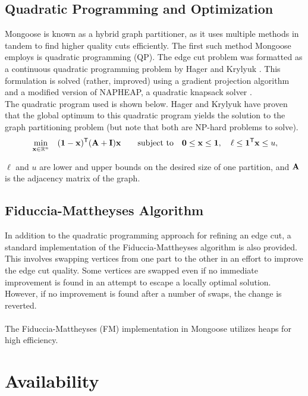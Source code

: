 \documentclass[letter]{article}
\newcommand{\m}[1]{{\bf{#1}}}
\newcommand{\tr}{^{\sf T}}
\begin{document}
\subsection{Quadratic Programming and Optimization}

Mongoose is known as a hybrid graph partitioner, as it uses multiple methods in tandem to find higher quality cuts efficiently. The first such method Mongoose employs is quadratic programming (QP). The edge cut problem was formatted as a continuous quadratic programming problem by Hager and Krylyuk \cite{HagerKrylyuk1999}. This formulation is solved (rather, improved) using a gradient projection algorithm and a modified version of NAPHEAP, a quadratic knapsack solver \cite{DavisHagerHungerford2016}.
\\

The quadratic program used is shown below. Hager and Krylyuk have proven that the global optimum to this quadratic program yields the solution to the graph partitioning problem (but note that both are NP-hard problems to solve).
%
\begin{eqnarray}
&\displaystyle\min_{\m{x}\in\mathbb{R}^n}\quad  (\m{1} - \m{x})\tr (\m{A} + \m{I})\m{x}
& \quad \mbox{subject to}  \quad
\m{0} \le \m{x} \le \m{1}, \quad \ell \le \m{1}\tr \m{x} \le u, \nonumber
\end{eqnarray}

$\ell$ and $u$ are lower and upper bounds on the desired size of one partition, and $\m{A}$ is the adjacency matrix of the graph.

\subsection{Fiduccia-Mattheyses Algorithm}

In addition to the quadratic programming approach for refining an edge cut, a standard implementation of the Fiduccia-Mattheyses algorithm \cite{FiducciaMattheyses1982} is also provided. This involves swapping vertices from one part to the other in an effort to improve the edge cut quality. Some vertices are swapped even if no immediate improvement is found in an attempt to escape a locally optimal solution. However, if no improvement is found after a number of swaps, the change is reverted.\\
\\
The Fiduccia-Mattheyses (FM) implementation in Mongoose utilizes heaps for high efficiency. 

\section{Availability}
\end{document}
